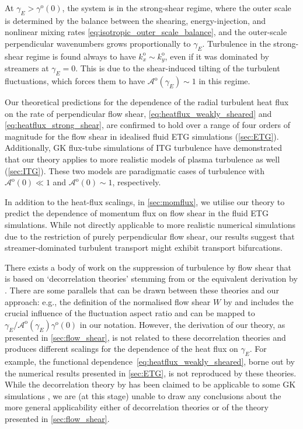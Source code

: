 \documentclass{jpp}
\newcommand{\kxo}{k_x^\text{o}}
\newcommand{\kyo}{k_y^\text{o}}
\newcommand{\gammaoO}{\gamma^\text{o}(0)}
\newcommand{\gammaE}{\gamma_{E}}
\newcommand{\A}{\mathcal{A}}
\newcommand{\Ao}{\A^\text{o}}
\newcommand{\AoO}{\A^\text{o}(0)}
\begin{document}
At \(\gammaE > \gammaoO\), the system is in the strong-shear regime, where the outer scale is determined by the balance between the shearing, energy-injection, and nonlinear mixing rates \cref{eq:isotropic_outer_scale_balance}, and the outer-scale perpendicular wavenumbers grows proportionally to \(\gammaE\). Turbulence in the strong-shear regime is found always to have \(\kxo \sim \kyo\), even if it was dominated by streamers at \(\gammaE=0\). This is due to the shear-induced tilting of the turbulent fluctuations, which forces them to have \(\Ao(\gammaE) \sim 1\) in this regime.

Our theoretical predictions for the dependence of the radial turbulent heat flux on the rate of perpendicular flow shear, \cref{eq:heatflux_weakly_sheared} and \cref{eq:heatflux_strong_shear}, are confirmed to hold over a range of four orders of magnitude for the flow shear in idealised fluid ETG simulations (\cref{sec:ETG}). Additionally, GK flux-tube simulations of ITG turbulence have demonstrated that our theory applies to more realistic models of plasma turbulence as well (\cref{sec:ITG}). These two models are paradigmatic cases of turbulence with \(\AoO \ll 1\) and \(\AoO \sim 1\), respectively.

In addition to the heat-flux scalings, in \cref{sec:momflux}, we utilise our theory to predict the dependence of momentum flux on flow shear in the fluid ETG simulations. While not directly applicable to more realistic numerical simulations due to the restriction of purely perpendicular flow shear, our results suggest that streamer-dominated turbulent transport might exhibit transport bifurcations.

There exists a body of work on the suppression of turbulence by flow shear that is based on `decorrelation theories' \citep{shaing90, biglari90, zhang92, zhang93, hatch18}  stemming from \citet{dupree72} or the equivalent derivation by \citet{zhang93}. There are some parallels that can be drawn between these theories and our approach: e.g., the definition of the normalised flow shear \(W\) by \citet{zhang92} and \citet{hatch18} includes the crucial influence of the fluctuation aspect ratio and can be mapped to \(\gammaE / \Ao(\gammaE) \gammaoO\) in our notation. However, the derivation of our theory, as presented in \cref{sec:flow_shear}, is not related to these decorrelation theories and produces different scalings for the dependence of the heat flux on \(\gammaE\). For example, the functional dependence~\cref{eq:heatflux_weakly_sheared}, borne out by the numerical results presented in \cref{sec:ETG}, is not reproduced by these theories. While the decorrelation theory by \citet{zhang92} has been claimed to be applicable to some GK simulations \citep{hatch18}, we are (at this stage) unable to draw any conclusions about the more general applicability either of decorrelation theories or of the theory presented in \cref{sec:flow_shear}.
\end{document}
